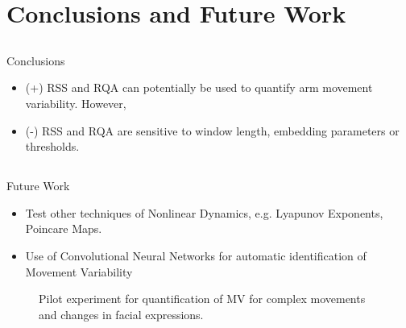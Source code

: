 

\section{Conclusions and Future Work}

\subsection{}
{
\begin{frame}{Conclusions}

\begin{itemize}
	\item (+) RSS and RQA can potentially be used to quantify arm movement variability.
However,
	\item (-) RSS and RQA are sensitive to window length, embedding parameters or thresholds.
\end{itemize}

\end{frame}
}

\subsection{}
{


\begin{frame}{Future Work}

\begin{itemize}
	\item Test other techniques of Nonlinear Dynamics, e.g. Lyapunov Exponents, Poincare Maps.
	\item Use of Convolutional Neural Networks for automatic identification of Movement Variability
\end{itemize}

\vspace{-1cm}

    \begin{figure}
	\caption{Pilot experiment for quantification of MV for complex movements and changes in facial expressions.} 
   \end{figure}
	
\end{frame}
}



